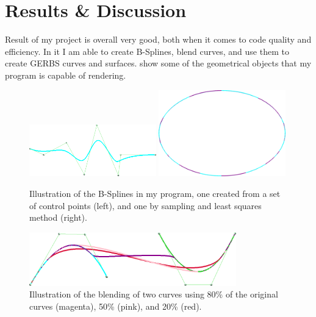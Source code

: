 \documentclass[a4paper,12pt]{extarticle}
\begin{document}
\section{Results \& Discussion} \label{sec:Results}
Result of my project is overall very good, both when it comes to code quality and efficiency. In it I am able to create B-Splines, blend curves, and use them to create GERBS curves and surfaces.  show some of the geometrical objects that my program is capable of rendering.

\begin{figure}[H]
  \centering
  \includegraphics[width=0.49\textwidth]{B-Spline.png}
  \includegraphics[width=0.49\textwidth]{Sampling.png}
  \caption{Illustration of the B-Splines in my program, one created from a set of control points (left), and one by sampling and least squares method (right).}
  \label{fig:B-Splines}
\end{figure}

\begin{figure}[H]
  \centering
  \includegraphics[width=0.8\textwidth]{Blending.png}
  \caption{Illustration of the blending of two curves using 80\% of the original curves (magenta), 50\% (pink), and 20\% (red).}
  \label{fig:Blending}
\end{figure}
\end{document}
